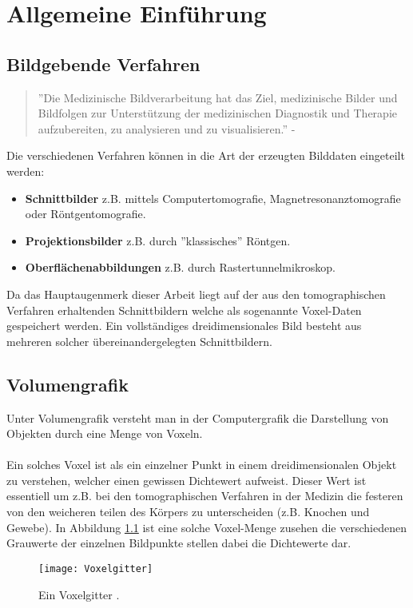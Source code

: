 \chapter{Allgemeine Einführung}

\section{Bildgebende Verfahren}
\begin{quote}
	''Die Medizinische Bildverarbeitung hat das Ziel, medizinische Bilder und Bildfolgen zur Unterstützung der medizinischen Diagnostik und Therapie aufzubereiten, zu analysieren und zu visualisieren.'' - \cite{MedBildVerarbeitung}
\end{quote}
Die verschiedenen Verfahren können in die Art der erzeugten Bilddaten eingeteilt werden:
\begin{itemize}
	\item \textbf{Schnittbilder} z.B. mittels Computertomografie, Magnetresonanztomografie oder Röntgentomografie.
	\item \textbf{Projektionsbilder} z.B. durch ''klassisches'' Röntgen.
	\item \textbf{Oberflächenabbildungen} z.B. durch Rastertunnelmikroskop.
\end{itemize}
Da das Hauptaugenmerk dieser Arbeit liegt auf der aus den tomographischen Verfahren erhaltenden Schnittbildern welche als sogenannte Voxel-Daten gespeichert werden. Ein vollständiges dreidimensionales Bild besteht aus mehreren solcher übereinandergelegten Schnittbildern.

\section{Volumengrafik}
Unter Volumengrafik versteht man in der Computergrafik die Darstellung von Objekten durch eine Menge von Voxeln. 
\\\\
Ein solches Voxel ist als ein einzelner Punkt in einem dreidimensionalen Objekt zu verstehen, welcher einen gewissen Dichtewert aufweist. Dieser Wert ist essentiell um z.B. bei den tomographischen Verfahren in der Medizin die festeren von den weicheren teilen des Körpers zu unterscheiden (z.B. Knochen und Gewebe). In Abbildung \ref{fig:Voxelgitter} ist eine solche Voxel-Menge zusehen die verschiedenen Grauwerte der einzelnen Bildpunkte stellen dabei die Dichtewerte dar.

\begin{figure}
	\centering
	\texttt{[image: Voxelgitter]}
	\caption{Ein Voxelgitter \cite{SeibtBak}.}
	\label{fig:Voxelgitter}
\end{figure}

